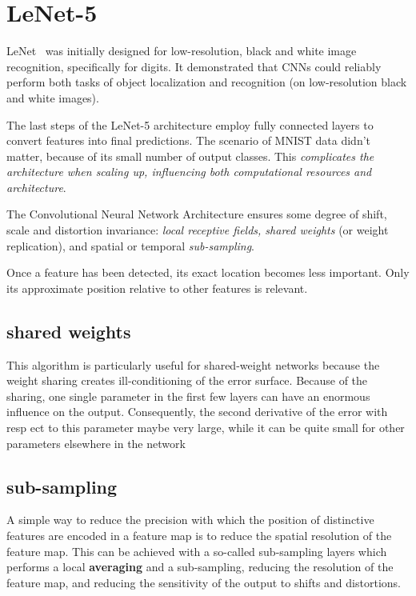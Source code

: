 \documentclass[11pt]{article}
\begin{document}


\tableofcontents

\clearpage

\section{LeNet-5}

LeNet~\cite{LeNet} was initially designed for low-resolution, black and white image recognition, specifically for digits. It demonstrated that CNNs could reliably perform both tasks of object localization and recognition (on low-resolution black and white images).

The last steps of the LeNet-5 architecture employ fully connected layers to convert features into final predictions. The scenario of MNIST data didn't matter, because of its small number of output classes. This \textit{complicates the architecture when scaling up, influencing both computational resources and architecture}.

The Convolutional Neural Network Architecture ensures some degree of shift, scale and distortion invariance: \textit{local receptive fields, shared weights} (or weight replication), and spatial or temporal \textit{sub-sampling}.

Once a feature has been detected, its exact location
becomes less important. Only its approximate position
relative to other features is relevant.

\subsection{shared weights}

This algorithm is particularly useful for shared-weight networks because the weight sharing creates ill-conditioning of the error surface. Because of the sharing, one single parameter in the first few layers can have an enormous influence on the output. Consequently, the second derivative of the error with resp ect to this parameter maybe very large, while it can be quite small for other parameters elsewhere in the network

\subsection{sub-sampling}

A simple way to reduce the precision with which the position of distinctive features are encoded in a feature map is to reduce the spatial resolution of the feature map. This can be achieved with a so-called sub-sampling layers which performs a local \textbf{averaging} and a sub-sampling, reducing the resolution of the feature map, and reducing the sensitivity of the output to shifts and distortions.
\end{document}
